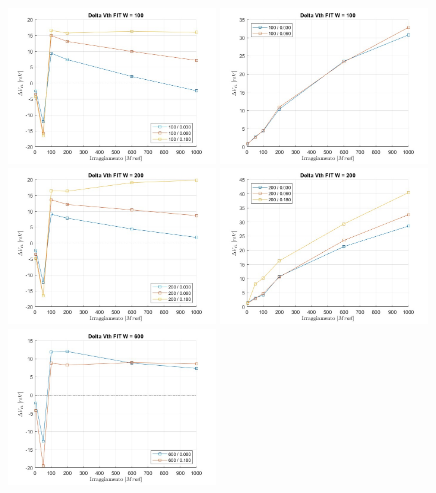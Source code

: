 \documentclass[
	a4paper,
	cleardoublepage=empty,
	headings=twolinechapter,
	numbers=autoenddot,
]{scrbook}
\begin{document}
\begin{figure}[H]
  \centering
  \includegraphics[width=0.49\textwidth]{sovrapposizione-deltaVth-FIT-N100}
  \includegraphics[width=0.49\textwidth]{sovrapposizione-deltaVth-FIT-P100}
  \includegraphics[width=0.49\textwidth]{sovrapposizione-deltaVth-FIT-N200}
  \includegraphics[width=0.49\textwidth]{sovrapposizione-deltaVth-FIT-P200}
  \includegraphics[width=0.49\textwidth]{sovrapposizione-deltaVth-FIT-N600}

\end{figure}
\end{document}
